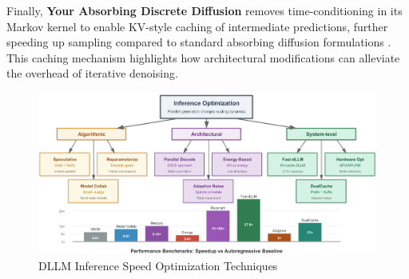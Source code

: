 Finally, \textbf{Your Absorbing Discrete Diffusion} removes time-conditioning in its Markov kernel to enable KV-style caching of intermediate predictions, further speeding up sampling compared to standard absorbing diffusion formulations \cite{ou_your_2025}. This caching mechanism highlights how architectural modifications can alleviate the overhead of iterative denoising.

\begin{figure}[ht]
    \centering
    \includegraphics[width=1.0\textwidth]{figs/8_inference_speed.pdf}
    \caption{DLLM Inference Speed Optimization Techniques}
    \label{fig:dllm_inference_speed}
\end{figure}

% 
% 